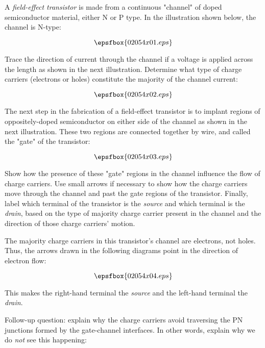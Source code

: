 

A {\it field-effect transistor} is made from a continuous "channel" of doped semiconductor material, either N or P type.  In the illustration shown below, the channel is N-type:

$$\epsfbox{02054x01.eps}$$

Trace the direction of current through the channel if a voltage is applied across the length as shown in the next illustration.  Determine what type of charge carriers (electrons or holes) constitute the majority of the channel current:

$$\epsfbox{02054x02.eps}$$

The next step in the fabrication of a field-effect transistor is to implant regions of oppositely-doped semiconductor on either side of the channel as shown in the next illustration.  These two regions are connected together by wire, and called the "gate" of the transistor:

$$\epsfbox{02054x03.eps}$$

Show how the presence of these "gate" regions in the channel influence the flow of charge carriers.  Use small arrows if necessary to show how the charge carriers move through the channel and past the gate regions of the transistor.  Finally, label which terminal of the transistor is the {\it source} and which terminal is the {\it drain}, based on the type of majority charge carrier present in the channel and the direction of those charge carriers' motion.







The majority charge carriers in this transistor's channel are electrons, not holes.  Thus, the arrows drawn in the following diagrams point in the direction of electron flow:

$$\epsfbox{02054x04.eps}$$

This makes the right-hand terminal the {\it source} and the left-hand terminal the {\it drain}.

\vskip 10pt

Follow-up question: explain why the charge carriers avoid traversing the PN junctions formed by the gate-channel interfaces.  In other words, explain why we do {\it not} see this happening:

